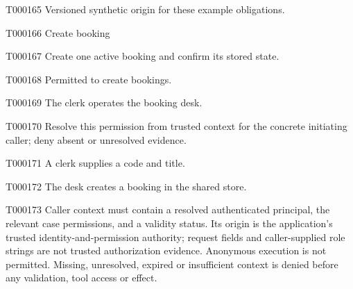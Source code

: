 \documentclass[11pt,a4paper]{article}
\begin{document}
\begin{atlasparagraph}{T000165}
Versioned synthetic origin for these example obligations.
\end{atlasparagraph}
\begin{atlastext}{T000166}
Create booking
\end{atlastext}
\begin{atlasparagraph}{T000167}
Create one active booking and confirm its stored state.
\end{atlasparagraph}
\begin{atlastext}{T000168}
Permitted to create bookings.
\end{atlastext}
\begin{atlasparagraph}{T000169}
The clerk operates the booking desk.
\end{atlasparagraph}
\begin{atlasparagraph}{T000170}
Resolve this permission from trusted context for the concrete initiating caller; deny absent or unresolved evidence.
\end{atlasparagraph}
\begin{atlasparagraph}{T000171}
A clerk supplies a code and title.
\end{atlasparagraph}
\begin{atlasparagraph}{T000172}
The desk creates a booking in the shared store.
\end{atlasparagraph}
\begin{atlasparagraph}{T000173}
Caller context must contain a resolved authenticated principal, the relevant case permissions, and a validity status. Its origin is the application's trusted identity-and-permission authority; request fields and caller-supplied role strings are not trusted authorization evidence. Anonymous execution is not permitted. Missing, unresolved, expired or insufficient context is denied before any validation, tool access or effect.
\end{atlasparagraph}
\end{document}
